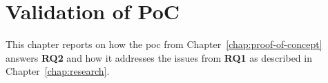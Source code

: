 \chapter{Validation of PoC}
\label{chap:validation}
This chapter reports on how the \gls{poc} from Chapter~\ref{chap:proof-of-concept} answers \textbf{RQ2} and how it addresses the issues from \textbf{RQ1} as described in Chapter~\ref{chap:research}.
